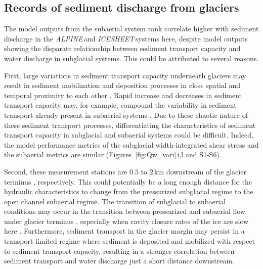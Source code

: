 \documentclass[11pt]{article}
\newcommand{\alpine}{\textit{ALPINE}\,}
\newcommand{\icesheet}{\textit{ICESHEET}\,}
\newcommand{\unit}[1]{$\mathrm{#1}$}
\begin{document}
\subsection{Records of sediment discharge  from glaciers}

The model outputs from the subaerial system rank correlate higher with sediment discharge in the \alpine and \icesheet systems here,
despite model outputs showing the disparate relationship between sediment transport capacity and water discharge in subglacial systems.
This could be attributed to several reasons.

First, large variations in sediment transport capacity underneath glaciers may result in sediment mobilization and deposition processes in close spatial and temporal proximity to each other \citep{gimbert2016,perolo2018,delaney2023}.
Rapid increase and decreases in sediment transport capacity may, for example, compound the variability in sediment transport already present in subaerial systems \citep[Figure~\ref{fig:Qw_vari}; ][]{williams1989,jerolmack2010}.
Due to these chaotic nature of these sediment transport processes, differentiating the characteristics of sediment transport capacity in subglacial and subaerial systems could be difficult.
Indeed, the model performance metrics of the subglacial width-integrated shear stress and the subaerial metrics are similar (Figures~\ref{fig:Qw_vari}\,i,l and S1-S6).

Second, these measurement stations are $0.5$ to $2$\,\unit{km} downstream of the glacier terminus \citep{cowton2012,felix2022}, respectively.
This could potentially be a long enough distance for the hydraulic characteristics to change from the pressurized subglacial regime to the open channel subaerial regime.
The transition of subglacial to subaerial conditions may occur in the transition between pressurized and subaerial flow under glacier terminus \citep{perolo2018}, especially when cavity closure rates of the ice are slow here \citep{egli2021b}.
Furthermore, sediment transport in the glacier margin may persist in a transport limited regime where sediment is deposited and mobilized with respect to sediment transport capacity, resulting in a stronger correlation between sediment transport and water discharge just a short distance downstream.
\end{document}
